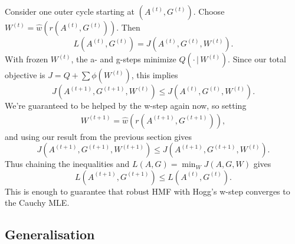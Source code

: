 \documentclass{article}
\begin{document}
Consider one outer cycle starting at $(A^{(t)}, G^{(t)})$.  
Choose $W^{(t)} = \hat{w}(r(A^{(t)},G^{(t)}))$.  
Then
\begin{equation}
    L(A^{(t)}, G^{(t)}) = J(A^{(t)}, G^{(t)}, W^{(t)}).
\end{equation}
With frozen $W^{(t)}$, the a- and g-steps minimize $Q(\cdot \,| \,W^{(t)})$.
Since our total objective is $J = Q + \sum \phi(W^{(t)})$, this implies
\begin{equation}    
    J(A^{(t+1)}, G^{(t+1)}, W^{(t)}) \le J(A^{(t)}, G^{(t)}, W^{(t)}).
\end{equation}
We're guaranteed to be helped by the w-step again now, so setting
\begin{align}
    W^{(t+1)} = \hat{w} \left( r(A^{(t+1)}, G^{(t+1)}) \right),
\end{align}
and using our result from the previous section gives
\begin{equation}
    J(A^{(t+1)}, G^{(t+1)}, W^{(t+1)}) \le J(A^{(t+1)}, G^{(t+1)}, W^{(t)}).
\end{equation}
Thus chaining the inequalities and $L(A,G) = \min_W J(A, G, W)$ gives
\begin{equation}
    L(A^{(t+1)}, G^{(t+1)}) \le L(A^{(t)}, G^{(t)}).
\end{equation}
This is enough to guarantee that robust HMF with Hogg's w-step converges to the Cauchy MLE.

\subsection{Generalisation}
\end{document}
